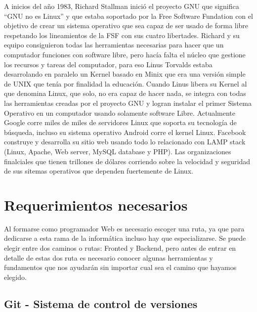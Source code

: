 \documentclass[twocolumns,a4paper]{IEEEtran}
\begin{document}
A inicios del año 1983, Richard Stallman inició el proyecto GNU que significa
``GNU no es Linux'' y que estaba soportado por la Free Software Fundation con
el objetivo de crear un sistema operativo que sea capaz de ser usado de forma
libre respetando los lineamientos de la FSF con sus cuatro libertades. Richard
y su equipo consiguieron todas las herramientas necesarias para hacer que un
computador funciones con software libre, pero hacía falta el núcleo que
gestione los recursos y tareas del computador, para eso Linus Torvalds estaba
desarrolando en paralelo un Kernel basado en Minix que era una versión simple
de UNIX que tenía por finalidad la educación. Cuando Linus libera su Kernel al
que denomina Linux, que solo, no era capaz de hacer nada, se integra con todas
las herramientas creadas por el proyecto GNU y logran instalar el primer
Sistema Operativo en un computador usando solamente software Libre.
Actualmente Google corre miles de miles de servidores Linux que soporta su
tecnología de búsqueda, incluso su sistema operativo Android corre el kernel
Linux. Facebook construye y desarrolla su sitio web usando todo lo relacionado
con LAMP stack (Linux, Apache, Web server, MySQL database y PHP). Las
organizaciones finalciales que tienen trillones de dólares corriendo sobre la
velocidad y seguridad de sus sitemas operativos que dependen fuertemente de
Linux\cite{ChrisNegusLinux2005}.
\newline

















\section{Requerimientos necesarios}
Al formarse como programador Web es necesario escoger una ruta, ya que para
dedicarse a esta rama de la informática incluso hay que especializarse. Se
puede elegir entre dos caminos o rutas: Fronted y Backend, pero antes de entrar
en detalle de estas dos ruta es necesario conocer algunas herramientas y
fundamentos que nos ayudarán sin importar cual sea el camino que hayamos
elegido.
\subsection{Git - Sistema de control de versiones}
\cite{pascual199012}\cite{mycite2016}\cite{Chavez-Campos2016}\cite{webdev:2018:online}\cite{SergioLujan2001}\cite{NataliaVazquezWeb2007}\cite{WebDev:2018:online}\cite{ScottBenGit2014}\cite{Ssh:2018:online}\cite{HTTP:2018:online}\cite{HTTPS:2018:online}\cite{ChrisNegusLinux2005}\cite{JoyanesProg2008}\cite{GuidesGitHub:2018:online}\cite{HTMLw3:2018:online}\cite{PluralsightJavaScript:2018:online}\cite{JavaScriptw3:2018:online}\cite{PythonTuto:2018:online}\cite{IntroPython2008}


\printbibliography
\end{document}
